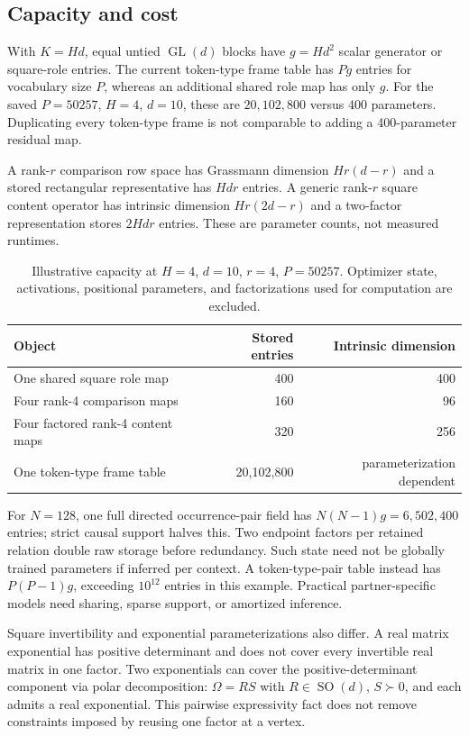 \documentclass[11pt,letterpaper]{article}
\newcommand{\GL}{\operatorname{GL}}
\newcommand{\SO}{\operatorname{SO}}
\theoremstyle{remark}
\begin{document}
\subsection{Capacity and cost}
With $K=Hd$, equal untied $\GL(d)$ blocks have $g=Hd^2$ scalar generator or square-role entries. The current token-type frame table has $Pg$ entries for vocabulary size $P$, whereas an additional shared role map has only $g$. For the saved $P=50257$, $H=4$, $d=10$, these are $20{,}102{,}800$ versus $400$ parameters. Duplicating every token-type frame is not comparable to adding a 400-parameter residual map.

A rank-$r$ comparison row space has Grassmann dimension $Hr(d-r)$ and a stored rectangular representative has $Hdr$ entries. A generic rank-$r$ square content operator has intrinsic dimension $Hr(2d-r)$ and a two-factor representation stores $2Hdr$ entries. These are parameter counts, not measured runtimes.

\begin{table}[tb]
\centering
\caption{Illustrative capacity at $H=4$, $d=10$, $r=4$, $P=50257$. Optimizer state, activations, positional parameters, and factorizations used for computation are excluded.}
\begin{tabularx}{\textwidth}{@{}Xrr@{}}
\toprule
Object & Stored entries & Intrinsic dimension\\
\midrule
One shared square role map & 400 & 400\\
Four rank-4 comparison maps & 160 & 96\\
Four factored rank-4 content maps & 320 & 256\\
One token-type frame table & 20,102,800 & parameterization dependent\\
\bottomrule
\end{tabularx}
\end{table}
For $N=128$, one full directed occurrence-pair field has $N(N-1)g=6{,}502{,}400$ entries; strict causal support halves this. Two endpoint factors per retained relation double raw storage before redundancy. Such state need not be globally trained parameters if inferred per context. A token-type-pair table instead has $P(P-1)g$, exceeding $10^{12}$ entries in this example. Practical partner-specific models need sharing, sparse support, or amortized inference.

Square invertibility and exponential parameterizations also differ. A real matrix exponential has positive determinant and does not cover every invertible real matrix in one factor. Two exponentials can cover the positive-determinant component via polar decomposition: $\Omega=RS$ with $R\in\SO(d)$, $S\succ0$, and each admits a real exponential. This pairwise expressivity fact does not remove constraints imposed by reusing one factor at a vertex.
\end{document}
